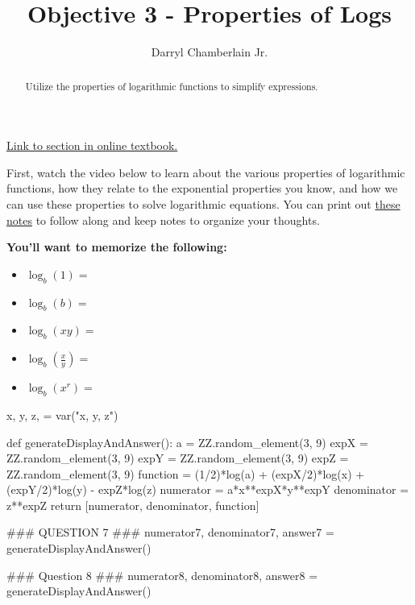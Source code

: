 \documentclass{ximera}
\author{Darryl Chamberlain Jr.}
\title{Objective 3 - Properties of Logs}
\begin{document}
\begin{abstract}
Utilize the properties of logarithmic functions to simplify expressions.
\end{abstract}
\maketitle

\href{https://cnx.org/contents/mwjClAV_@8.1:nVZd13Io@12/Logarithmic-Properties}{Link to section in online textbook.}


First, watch the video below to learn about the various properties of logarithmic functions, how they relate to the exponential properties you know, and how we can use these properties to solve logarithmic equations. You can print out \href{http://people.clas.ufl.edu/dchamberlain31/files/Objective-3-Properties-of-Logs.pdf}{these notes} to follow along and keep notes to organize your thoughts.  


\textbf{You'll want to memorize the following:}

\begin{itemize}
\item $\log_b(1) = $
\item $\log_b(b) = $
\item $\log_b(xy) = $
\item $\log_b(\frac{x}{y}) = $
\item $\log_b(x^r) = $
\end{itemize}


\begin{sagesilent}
x, y, z, = var("x, y, z")

def generateDisplayAndAnswer():
    a = ZZ.random_element(3, 9)
    expX = ZZ.random_element(3, 9)
    expY = ZZ.random_element(3, 9)
    expZ = ZZ.random_element(3, 9)
    function = (1/2)*log(a) + (expX/2)*log(x) + (expY/2)*log(y) - expZ*log(z)
    numerator = a*x**expX*y**expY
    denominator = z**expZ
    return [numerator, denominator, function]

### QUESTION 7 ###
numerator7, denominator7, answer7 = generateDisplayAndAnswer()

### Question 8 ###
numerator8, denominator8, answer8 = generateDisplayAndAnswer()
\end{sagesilent}
\end{document}
